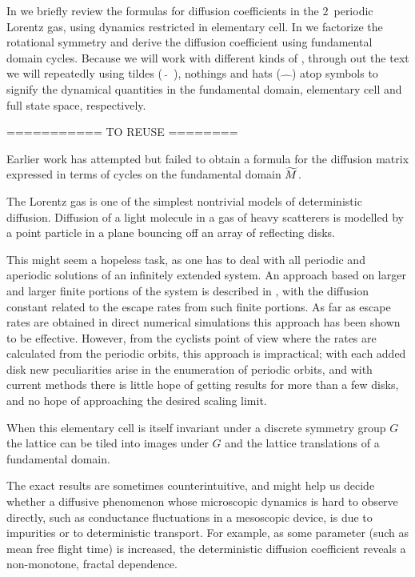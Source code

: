 In  we briefly review the formulas for diffusion
coefficients in the $2$\dmn\ periodic Lorentz gas, using dynamics
restricted in elementary cell. In  we
factorize the rotational symmetry and derive the diffusion coefficient
using fundamental domain cycles. Because we will work with different
kinds of \statesp, through out the text we will repeatedly using tildes
($\tilde{\quad}$), nothings and hats ($\hat{\quad}$) atop symbols to
signify the dynamical quantities in the fundamental domain, elementary
cell and full state space, respectively.


\bigskip
=========== TO REUSE ========


Earlier work has attempted but failed to obtain a formula
for the diffusion matrix expressed in terms of cycles on the fundamental
domain ${\widetilde M}$.


\bigskip

The Lorentz gas is one of the simplest nontrivial models
of deterministic diffusion.
Diffusion of a light molecule in a gas of heavy scatterers
is modelled
by a point particle in a plane bouncing off an array of reflecting disks.

This might seem a hopeless task, as one
has to deal with all periodic and aperiodic
solutions of an infinitely extended system. An
approach based on larger and larger finite portions of the system is described
in , with the diffusion constant related to
the escape rates from such finite portions.
As far as escape rates are obtained in direct numerical simulations
this approach has been shown to be effective.
However, from the cyclists point of view
where the rates are calculated from the periodic orbits,
this approach is impractical; with each added disk new peculiarities arise
in the enumeration of periodic orbits, and with current
methods there is little hope of getting results for more than a few disks,
and no hope of approaching the desired scaling limit.

When this elementary cell is itself invariant under a discrete symmetry
group $G$ the lattice can be tiled into images under $G$ and the lattice
translations of a fundamental domain.

The exact results are sometimes counterintuitive, and might help us
decide whether a diffusive phenomenon whose microscopic dynamics is hard
to observe directly, such as conductance fluctuations in a mesoscopic
device, is due to impurities or to deterministic transport. For example,
as some parameter (such as mean free flight time) is increased, the
deterministic diffusion coefficient reveals a non-monotone, fractal
dependence.
